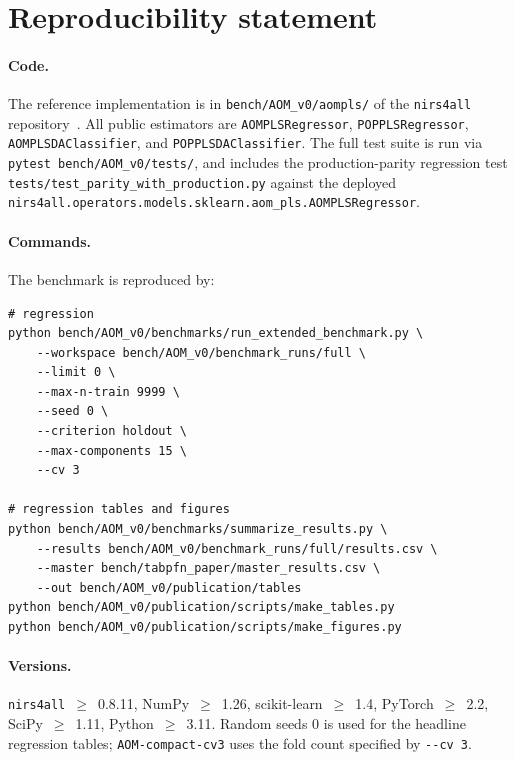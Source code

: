 \documentclass[review,a4paper]{elsarticle}
\newcommand{\nirsfourall}{\texttt{nirs4all}\xspace}
\begin{document}
\section{Reproducibility statement}\label{sec:reproducibility}

\paragraph{Code.}
The reference implementation is in
\verb|bench/AOM_v0/aompls/| of the
\nirsfourall repository~\cite{nirs4all2025}. All public estimators are
\verb|AOMPLSRegressor|, \verb|POPPLSRegressor|, \verb|AOMPLSDAClassifier|,
and \verb|POPPLSDAClassifier|. The full test suite is run via
\verb|pytest bench/AOM_v0/tests/|, and includes the production-parity
regression test
\verb|tests/test_parity_with_production.py| against the deployed
\verb|nirs4all.operators.models.sklearn.aom_pls.AOMPLSRegressor|.

\paragraph{Commands.}
The benchmark is reproduced by:
\begin{verbatim}
# regression
python bench/AOM_v0/benchmarks/run_extended_benchmark.py \
    --workspace bench/AOM_v0/benchmark_runs/full \
    --limit 0 \
    --max-n-train 9999 \
    --seed 0 \
    --criterion holdout \
    --max-components 15 \
    --cv 3

# regression tables and figures
python bench/AOM_v0/benchmarks/summarize_results.py \
    --results bench/AOM_v0/benchmark_runs/full/results.csv \
    --master bench/tabpfn_paper/master_results.csv \
    --out bench/AOM_v0/publication/tables
python bench/AOM_v0/publication/scripts/make_tables.py
python bench/AOM_v0/publication/scripts/make_figures.py
\end{verbatim}

\paragraph{Versions.}
\nirsfourall~$\geq$~0.8.11, NumPy~$\geq$~1.26, scikit-learn~$\geq$~1.4,
PyTorch~$\geq$~2.2, SciPy~$\geq$~1.11, Python~$\geq$~3.11. Random seeds
$0$ is used for the headline regression tables; \texttt{AOM-compact-cv3}
uses the fold count specified by \verb|--cv 3|.
\end{document}
